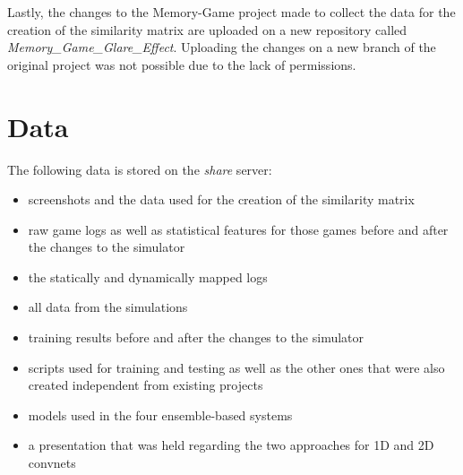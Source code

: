 Lastly, the changes to the Memory-Game project made to collect the data for the creation of the similarity matrix are uploaded on a new repository called \textit{Memory\_Game\_Glare\_Effect}. Uploading the changes on a new branch of the original project was not possible due to the lack of permissions.

\newpage

\section{Data}
The following data is stored on the \textit{share} server:
\begin{itemize}
	\item screenshots and the data used for the creation of the similarity matrix
	\item raw game logs as well as statistical features for those games before and after the changes to the simulator
	\item the statically and dynamically mapped logs
	\item all data from the simulations
	\item training results before and after the changes to the simulator 
	\item scripts used for training and testing as well as the other ones that were also created independent from existing projects 
	\item models used in the four ensemble-based systems 
	\item a presentation that was held regarding the two approaches for 1D and 2D convnets
\end{itemize}
 





 




